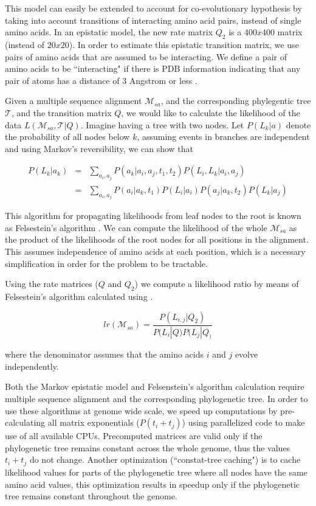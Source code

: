 This model can easily be extended to account for co-evolutionary hypothesis by taking into account transitions of interacting amino acid pairs, instead of single amino acids. In an epistatic model, the new rate matrix $Q_2$ is a $400x400$ matrix (instead of $20x20$). In order to estimate this epistatic transition matrix, we use pairs of amino acids that are assumed to be interacting. We define a pair of amino acids to be ``interacting" if there is PDB information indicating that any pair of atoms has a distance of 3 Angstrom or less \cite{burger2010disentangling}.

Given a multiple sequence alignment $\mathcal{M}_{sa}$, and the corresponding phylegentic tree $\mathcal{T}$, and the transition matrix $Q$, we would like to calculate the likelihood of the data $L(\mathcal{M}_{sa}, \mathcal{T} | Q)$. Imagine having a tree with two nodes. Let $P(L_k|a)$ denote the probability of all nodes below $k$, assuming events in branches are independent and using Markov's reversibility, we can show that \cite{durbin1998biological}

\begin{eqnarray*}
	P(L_k |  a_k ) 
	& = & \sum_{a_i, a_j}{ P(a_k | a_i, a_j, t_1, t_2) P(L_i, L_k | a_i, a_j)  } \\
	& = & \sum_{a_i, a_j}{ P(a_i | a_k, t_1) P(L_i | a_i ) P(a_j | a_k, t_2) P( L_k | a_j) }
\end{eqnarray*}

This algorithm for propagating likelihoods from leaf nodes to the root is known as Felsestein's algorithm \cite{felsenstein2004inferring}. We can compute the likelihood of the whole $\mathcal{M}_{sa}$ as the product of the likelihoods of the root nodes for all positions in the alignment. This assumes independence of amino acids at each position, which is a necessary simplification in order for the problem to be tractable.

Using the rate matrices ($Q$ and $Q_2$) we compute a likelihood ratio by means of Felsestein’s algorithm calculated using .

\[
	lr(\mathcal{M}_{sa}) = \frac{P(L_{i,j} | Q_2)}{P(L_i | Q) P(L_j | Q_)}
\]

where the denominator assumes that the amino acids $i$ and $j$ evolve independently. 

Both the Markov epistatic model and Felsenstein’s algorithm calculation require multiple sequence alignment and the corresponding phylogenetic tree. In order to use these algorithms at genome wide scale, we speed up computations by pre-calculating all matrix exponentials ($P(t_i+t_j)$) using parallelized code to make use of all available CPUs. Precomputed matrices are valid only if the phylogenetic tree remains constant across the whole genome, thus the values $t_i+t_j$ do not change. Another optimization (``constat-tree caching") is to cache likelihood values for parts of the phylogenetic tree where all nodes have the same amino acid values, this optimization results in speedup only if the phylogenetic tree remains constant throughout the genome.

